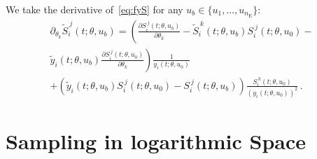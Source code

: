 \documentclass[utf8,english]{scrartcl}
\begin{document}
We take the derivative of~\eqref{eq:fyS} for any $u_b\in\{u_1,\dots,u_{n_{\text{E}}}\}$:
\begin{multline}
  \partial_{\theta_k} \tilde S_i^{~j}(t;\theta,u_b)
  =\left(\frac{\partial S_i^{~j}(t;\theta,u_b)}{\partial\theta_k} -\right.
    \tilde S_i^{~k}(t;\theta,u_b)S_i^{~j}(t;\theta,u_0) -\\ 
    \left.\tilde y_i(t;\theta,u_b)\frac{\partial S_i^{~j}(t;\theta,u_0)}{\partial
      \theta_k}\right) \frac{1}{y_i(t;\theta,u_0)}\\
  +\left(\tilde y_i(t;\theta,u_b) S_i^{~j}(t;\theta,u_0) - S_i^{~j}(t;\theta,u_b)\right)\frac{S_i^{~k}(t;\theta,u_0)}{(y_i(t;\theta,u_0))^2}\label{eq:dfyS}\,.
\end{multline}

\section{Sampling in logarithmic Space}
\label{sec:rho}
\end{document}
